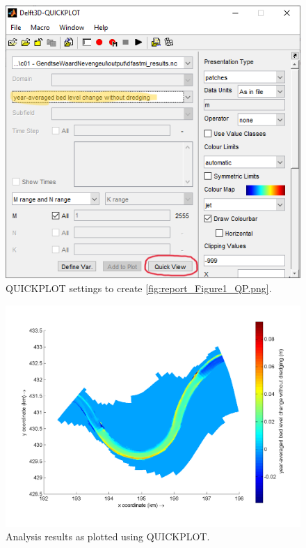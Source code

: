 \hypertarget{code-report}{}

\begin{figure}[H]
	\center
	\includegraphics[width=12cm]{figures/manual_system_test_8_quickplot_usage.png}
	\caption{QUICKPLOT settings to create \autoref{fig:report_Figure1_QP.png}.}
	\label{fig:manual_system_test_8_quickplot_usage.png}
\end{figure}

\begin{figure}[H]
\center
\includegraphics[width=12cm]{figures/report_Figure1_QP.png}
\caption{Analysis results as plotted using QUICKPLOT.}
\label{fig:report_Figure1_QP.png}
\end{figure}

